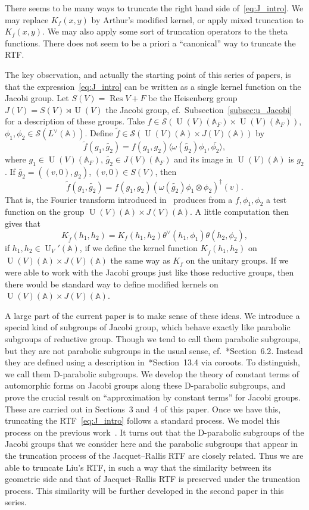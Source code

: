 \documentclass[letterpaper,11pt]{amsart}
\newcommand{\bA}{\mathbb{A}}
\newcommand{\cS}{\mathcal{S}}
\newcommand{\<}{\negthickspace}
\DeclareMathOperator{\U}{U}
\DeclareMathOperator{\Res}{Res}
\theoremstyle{definition}
\theoremstyle{plain}
\theoremstyle{remark}
\numberwithin{equation}{section}
\begin{document}
There seems to be many ways to truncate the right hand side of~\eqref{eq:J_intro}. We may replace $K_f(x, y)$ by Arthur's modified kernel, or apply mixed truncation to $K_f(x, y)$. We may also apply some sort of truncation operators to the theta functions. There does not seem to be a priori a ``canonical'' way to truncate the RTF.

The key observation, and actually the starting point of this series of papers, is that the expression~\eqref{eq:J_intro} can be written as a single kernel function on the Jacobi group. 
Let $S(V) = \Res V + F$ be the Heisenberg group $J(V) = S(V) \rtimes \U(V)$ the Jacobi group, cf.~Subsection~\ref{subsec:u_Jacobi} for a description of these groups. Take $f \in \cS(\U(V)(\bA_F) \times \U(V)(\bA_F))$, $\phi_1, \phi_2 \in \cS(L^\vee(\bA))$. Define $\widetilde{f} \in \cS(\U(V)(\bA) \times J(V)(\bA))$ by
    \[
    \widetilde{f}(g_1, \widetilde{g_2}) =
    f(g_1, g_2)  \langle \omega(\widetilde{g_2}) \phi_1,
    \overline{\phi_2}\rangle,
    \]
where $g_1 \in \U(V)(\bA_F)$, $\widetilde{g_2} \in J(V)(\bA_F)$ and its image in $\U(V)(\bA)$ is $g_2$. If $\widetilde{g_2} = ((v, 0), g_2)$, $(v, 0) \in S(V)$, then
    \[
    \widetilde{f}(g_1, \widetilde{g_2}) =
    f(g_1, g_2)
    (\omega(\widetilde{g_2}) \phi_1 \otimes \phi_2)^\ddag(v) .
    \]
That is, the Fourier transform introduced in~\cite{Liu} produces from a $f, \phi_1, \phi_2$ a test function on the group $\U(V)(\bA) \times J(V)(\bA)$. A little computation then gives that
    \[
    K_{\widetilde{f}}(h_1, h_2) = K_f(h_1, h_2) \theta^\vee(h_1, \phi_1)
    \theta(h_2, \phi_2),
    \]
if $h_1, h_2 \in \U_V'(\bA)$, if we define the kernel function $K_{\widetilde{f}}(h_1, h_2)$ on $\U(V)(\bA) \times J(V)(\bA)$ the same way as $K_f$ on the unitary groups. If we were able to work with the Jacobi groups just like those reductive groups, then there would be standard way to define modified kernels on $\U(V)(\bA) \times J(V)(\bA)$. 

A large part of the current paper is to make sense of these ideas. We introduce a special kind of subgroups of Jacobi group, which behave exactly like parabolic subgroups of reductive group. Though we tend to call them parabolic subgroups, but they are not parabolic subgroups in the usual sense, cf.~\cite{Springer}*{Section~6.2}. Instead they are defined using a description in~\cite{Springer}*{Section~13.4} via coroots. To distinguish, we call them D-parabolic subgroups. We develop the theory of constant terms of automorphic forms on Jacobi groups along these D-parabolic subgroups, and prove the crucial result on ``approximation by constant terms'' for Jacobi groups. These are carried out in Sections~3 and~4 of this paper. Once we have this, truncating the RTF~\eqref{eq:J_intro} follows a standard process. We model this process on the previous work~\cite{BPCZ}. It turns out that the D-parabolic subgroups of the Jacobi groups that we consider here and the parabolic subgroups that appear in the truncation process of the Jacquet--Rallis RTF are closely related. Thus we are able to truncate Liu's RTF, in such a way that the similarity between its geometric side and that of Jacquet--Rallis RTF is preserved under the truncation process. This similarity will be further developed in the second paper in this series.
\end{document}
